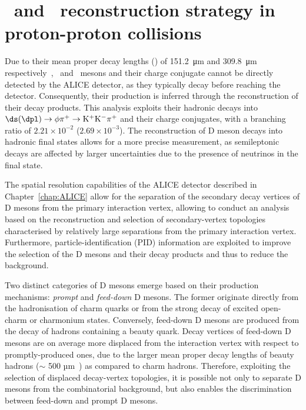 \chapter{\dpl\ and \ds\ reconstruction strategy in proton-proton collisions}

Due to their mean proper decay lengths (\ct) of \SI{151.2}{\micro\meter} and \SI{309.8}{\micro\meter} respectively~\cite{pdg}, \ds\ and \dpl\ mesons and their charge conjugate cannot be directly detected by the ALICE detector, as they typically decay before reaching the detector. Consequently, their production is inferred through the reconstruction of their decay products. This analysis exploits their hadronic decays into $\ds (\dpl) \rightarrow \mathrm{\phi\pi^+ \rightarrow K^+K^-\pi^+}$ and their charge conjugates, with a branching ratio of $2.21\times10^{-2}$ ($2.69\times10^{-3}$). The reconstruction of D meson decays into hadronic final states allows for a more precise measurement, as semileptonic decays are affected by larger uncertainties due to the presence of neutrinos in the final state.

The spatial resolution capabilities of the ALICE detector described in Chapter~\ref{chap:ALICE} allow for the separation of the secondary decay vertices of D mesons from the primary interaction vertex, allowing to conduct an analysis based on the reconstruction and selection of secondary-vertex topologies characterised by relatively large separations from the primary interaction vertex. Furthermore, particle-identification (PID) information are exploited to improve the selection of the D mesons and their decay products and thus to reduce the background.

Two distinct categories of D mesons emerge based on their production mechanisms: \emph{prompt} and \emph{feed-down} D mesons. The former originate directly from the hadronisation of charm quarks or from the strong decay of excited open-charm or charmonium states. Conversely, feed-down D mesons are produced from the decay of hadrons containing a beauty quark. Decay vertices of feed-down D mesons are on average more displaced from the interaction vertex with respect to promptly-produced ones, due to the larger mean proper decay lengths of beauty hadrons (\ct $\sim$ 500 µm~\cite{pdg}) as compared to charm hadrons. Therefore, exploiting the selection of displaced decay-vertex topologies, it is possible not only to separate D mesons from the combinatorial background, but also enables the discrimination between feed-down and prompt D mesons.

